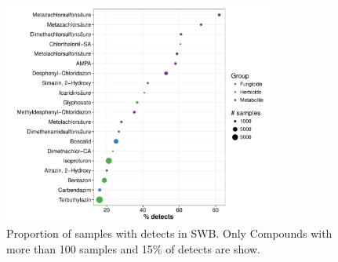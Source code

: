 \documentclass[pdftex,a4paper]{scrreprt}
\begin{document}
\begin{figure}[h]
	\centering
	\includegraphics[width = 0.8\textwidth]{pdetects}
	\caption[Proportion of samples with detects in SWB.]{Proportion of samples with detects in SWB. Only Compounds with more than 100 samples and 15\% of detects are show.}
	\label{fig:pdetects}
\end{figure}





\end{document}
